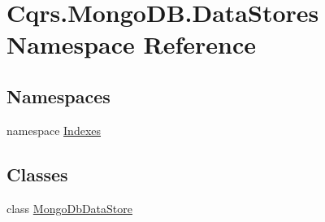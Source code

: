 \hypertarget{namespaceCqrs_1_1MongoDB_1_1DataStores}{}\section{Cqrs.\+Mongo\+D\+B.\+Data\+Stores Namespace Reference}
\label{namespaceCqrs_1_1MongoDB_1_1DataStores}
\subsection*{Namespaces}
\begin{DoxyCompactItemize}
\item 
namespace \hyperlink{namespaceCqrs_1_1MongoDB_1_1DataStores_1_1Indexes}{Indexes}
\end{DoxyCompactItemize}
\subsection*{Classes}
\begin{DoxyCompactItemize}
\item 
class \hyperlink{classCqrs_1_1MongoDB_1_1DataStores_1_1MongoDbDataStore}{Mongo\+Db\+Data\+Store}
\end{DoxyCompactItemize}
